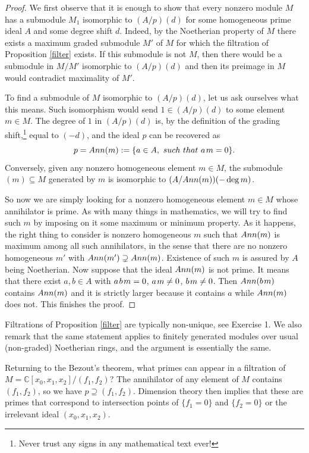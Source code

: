 \documentclass[11pt]{article}
\numberwithin{equation}{section}
\numberwithin{footnote}{section}
\newcommand{\C}{{\mathbb C}}
\begin{document}
\begin{proof}
We first observe that it is enough to show that every nonzero module $M$ has a submodule $M_1$ isomorphic to $(A/p)(d)$ for some homogeneous prime ideal $A$ and some degree shift $d$. Indeed, by the Noetherian property of $M$ there exists a maximum graded submodule $M'$ of $M$ for which the filtration of Proposition \ref{filter} exists. If this submodule is not $M$, then there would be a submodule in $M/M'$ isomorphic to $(A/p)(d)$ and then its preimage in $M$ would  contradict maximality of $M'$.

To find a submodule of $M$ isomorphic to $(A/p)(d)$, let us ask ourselves what this means. Such isomorphism would send $1\in (A/p)(d)$ to some element $m\in M$. The degree of $1$ in $(A/p)(d)$ is, by the definition of the grading shift,\footnote{ Never trust any signs in any mathematical text ever!} equal to $(-d)$, and the ideal $p$ can be recovered as 
$$
p = {\rm Ann}(m):= \{a\in A,{\rm ~such~that~}a\hskip 1pt m=0\}.
$$
Conversely, given any nonzero homogeneous element $m\in M$, the submodule $(m)\subseteq M$  generated by $m$ is
isomorphic to 
$(A/ {\rm Ann}(m))(-\deg m)$.

So now we are simply looking for a nonzero homogeneous element $m\in M$ whose annihilator is prime. As with many things in mathematics, we will try to find such $m$ by imposing on it some maximum or minimum property. As it happens, the right thing to consider is nonzero homogeneous $m$ such that ${\rm Ann}(m)$ is maximum among all such annihilators, in the sense that there are no nonzero homogeneous $m'$ with ${\rm Ann}(m')\supsetneq {\rm Ann}(m)$. Existence of such $m$ is assured  by $A$ being Noetherian. Now suppose that the ideal ${\rm Ann}(m)$ is not prime. It means that there exist $a,b\in A$ with $a\hskip 1pt b\hskip 1ptm=0$, $a\hskip 1pt m\neq 0$, $b\hskip 1pt m\neq 0$. Then ${\rm Ann}(b\hskip 1pt m)$ contains ${\rm Ann}(m)$ and it is strictly larger because it contains $a$ while ${\rm Ann}(m)$ does not. This finishes the proof.
\end{proof}

Filtrations  of Proposition \ref{filter} are typically non-unique, see Exercise 1.
We also remark that the same statement applies to finitely generated modules over usual (non-graded) Noetherian rings, and the argument is essentially the same. 

\smallskip
Returning to the Bezout's theorem,
what primes can appear in a filtration of $M=\C[x_0,x_1,x_2]/(f_1,f_2)$? The annihilator of any element of $M$ contains $(f_1,f_2)$, so we have $p\supseteq (f_1,f_2)$. Dimension theory then implies that these are primes that correspond to intersection points of $\{f_1=0\}$ and $\{f_2=0\}$ or the irrelevant ideal $(x_0,x_1,x_2)$. 
\end{document}
